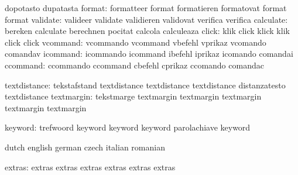                            dopotasto                 dupatasta
                   format: formatteer                format
                           formatieren               formatovat
                           format                    format %
                 validate: valideer                  validate
                           validieren                validovat
                           verifica                  verifica
                calculate: bereken                   calculate
                           berechnen                 pocitat
                           calcola                   calculeaza
                    click: klik                      click
                           klick                     klik
                           click                     click
                 vcommand: vcommando                 vcommand
                           vbefehl                   vprikaz
                           vcomando                  comandav
                 icommand: icommando                 icommand
                           ibefehl                   iprikaz
                           icomando                  comandai
                 ccommand: ccommando                 ccommand
                           cbefehl                   cprikaz
                           ccomando                  comandac

             textdistance: tekstafstand              textdistance
                           textdistance              textdistance
                           distanzatesto             textdistance %
               textmargin: tekstmarge                textmargin
                           textmargin                textmargin
                           textmargin                textmargin   %

  keyword: trefwoord keyword
           keyword keyword
           parolachiave keyword

\stopconstants


\startconstants            dutch                     english
                           german                    czech
                           italian                   romanian

                   extras: extras                    extras
                           extras                    extras
                           extras                    extras

\stopconstants

